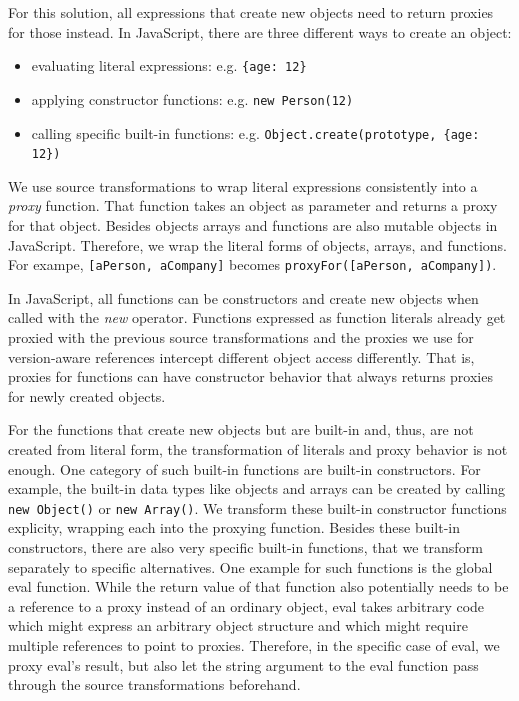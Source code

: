 For this solution, all expressions that create new objects need to return proxies for those instead.
In JavaScript, there are three different ways to create an object: 
\begin{itemize}
    \item evaluating literal expressions: e.g. \lstinline|{age: 12}|
    \item applying constructor functions: e.g. \lstinline|new Person(12)|
    \item calling specific built-in functions: e.g. \lstinline|Object.create(prototype, {age: 12})|
\end{itemize}

We use source transformations to wrap literal expressions consistently into a \emph{proxy} function.
That function takes an object as parameter and returns a proxy for that object.
Besides objects arrays and functions are also mutable objects in JavaScript.
Therefore, we wrap the literal forms of objects, arrays, and functions.
For exampe, \lstinline{[aPerson, aCompany]} becomes \lstinline{proxyFor([aPerson, aCompany])}.

In JavaScript, all functions can be constructors and create new objects when called with the \emph{new} operator.
Functions expressed as function literals already get proxied with the previous source transformations and the proxies we use for version-aware references intercept different object access differently.
That is, proxies for functions can have constructor behavior that always returns proxies for newly created objects.

For the functions that create new objects but are built-in and, thus, are not created from literal form, the transformation of literals and proxy behavior is not enough.
One category of such built-in functions are built-in constructors.
For example, the built-in data types like objects and arrays can be created by calling \lstinline{new Object()} or \lstinline{new Array()}.
We transform these built-in constructor functions explicity, wrapping each into the proxying function.
Besides these built-in constructors, there are also very specific built-in functions, that we transform separately to specific alternatives.
One example for such functions is the global eval function.
While the return value of that function also potentially needs to be a reference to a proxy instead of an ordinary object, eval takes arbitrary code which might express an arbitrary object structure and which might require multiple references to point to proxies.
Therefore, in the specific case of eval, we proxy eval's result, but also let the string argument to the eval function pass through the source transformations beforehand.

